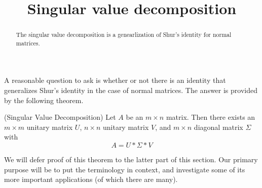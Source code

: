 \documentclass{ximera}
\title{Singular value decomposition}
\begin{document}
\begin{abstract}
  The singular value decomposition is a genearlization of Shur's
  identity for normal matrices.
\end{abstract}
\maketitle

A reasonable question to ask is whether or not there is an identity that generalizes Shur's identity in the case of normal matrices. The answer is provided by the following theorem.

\begin{theorem} (Singular Value Decomposition) Let $A$ be an $m\times n$ matrix. Then there exists an $m\times m$ unitary matrix $U$, $n\times n$ unitary matrix $V$, and $m\times n$ diagonal matrix $\Sigma$ with
\[
A = U*\Sigma*V
\]
\end{theorem}

We will defer proof of this theorem to the latter part of this section. Our primary purpose will be to put the terminology in context, and investigate some of its more important applications (of which there are many).
\end{document}
